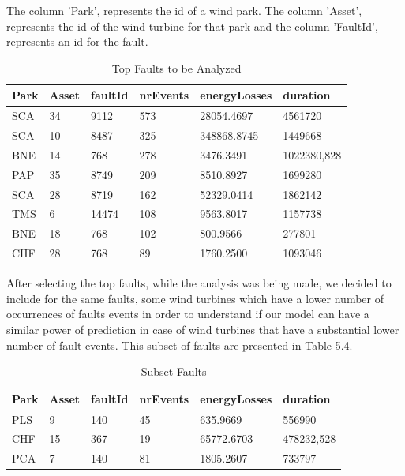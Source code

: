 The column 'Park', represents the id of a wind park. The column 'Asset', represents the id of the wind turbine for that park and the column 'FaultId', represents an id for the fault.

\begin{table}[!ht]
    \centering
    \begin{tabular}{|l|l|l|l|l|l|}
    \hline
        Park & Asset & faultId & nrEvents & energyLosses & duration \\ \hline
        SCA & 34 & 9112 & 573 & 28054.4697 & 4561720 \\ \hline
        SCA & 10 & 8487 & 325 & 348868.8745 & 1449668 \\ \hline
        BNE & 14 & 768 & 278 & 3476.3491 & 1022380,828 \\ \hline
        PAP & 35 & 8749 & 209 & 8510.8927 & 1699280 \\ \hline
        SCA & 28 & 8719 & 162 & 52329.0414 & 1862142 \\ \hline
        TMS & 6 & 14474 & 108 & 9563.8017 & 1157738 \\ \hline
        BNE & 18 & 768 & 102 & 800.9566 & 277801 \\ \hline
        CHF & 28 & 768 & 89 & 1760.2500 & 1093046 \\ \hline
    \end{tabular}
    \caption{Top Faults to be Analyzed}
    \label{TopFaultsTable}
\end{table}

After selecting the top faults, while the analysis was being made, we decided to include for the same faults, some wind turbines which have a lower number of occurrences of faults events in order to understand if our model can have a similar power of prediction in case of wind turbines that have a substantial lower number of fault events. This subset of faults are presented in Table 5.4.

\begin{table}[!ht]
    \centering
    \begin{tabular}{|l|l|l|l|l|l|}
    \hline
        Park & Asset & faultId & nrEvents & energyLosses & duration \\ \hline
        PLS & 9 & 140 & 45 & 635.9669 & 556990 \\ \hline
        CHF & 15 & 367 & 19 & 65772.6703 & 478232,528 \\ \hline
        PCA & 7 & 140 & 81 & 1805.2607 & 733797 \\ \hline
    \end{tabular}
    \caption{Subset Faults}
    \label{Subset of Faults with less occurences that are going to be analyzed}
\end{table}


